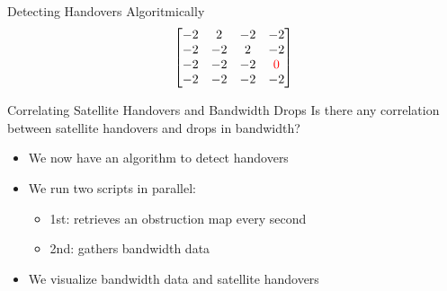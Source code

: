 \documentclass[NET,english,beameralt]{tumbeamer}
\begin{document}
\begin{frame}{Detecting Handovers Algoritmically}
{$$\begin{bmatrix}
            -2 & 2            &  -2          &           -2 \\
            -2 & -2           &  2           &           -2 \\
            -2 & -2           & -2           & \color{red}0 \\
            -2 & -2           & -2           &           -2 \\
        \end{bmatrix}$$
    }
\end{frame}

\begin{frame}[fragile]{Correlating Satellite Handovers and Bandwidth Drops}
    Is there any correlation between satellite handovers and drops in bandwidth?
    \begin{itemize}
        \item We now have an algorithm to detect handovers
        \item We run two scripts in parallel:
            \begin{itemize}
                \item 1st: retrieves an obstruction map every second
                \item 2nd: gathers bandwidth data
            \end{itemize} 
        \item We visualize bandwidth data and satellite handovers 
    \end{itemize}
\end{frame}
\end{document}
